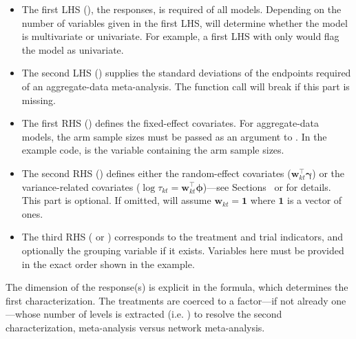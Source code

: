 \begin{itemize}
  \item The first LHS (), the responses, is required of all models. Depending on the number of variables given in the first LHS,  will determine whether the model is multivariate or univariate. For example, a first LHS with only  would flag the model as univariate.
  \item The second LHS () supplies the standard deviations of the endpoints required of an aggregate-data meta-analysis. The function call will break if this part is missing.
  \item The first RHS () defines the fixed-effect covariates. For aggregate-data models, the arm sample sizes must be passed as an argument to . In the example code,  is the variable containing the arm sample sizes.
  \item The second RHS () defines either the random-effect covariates ($\boldsymbol{w}_{kt}^\top \boldsymbol{\gamma}$) or the variance-related covariates ($\log \tau_{kt} = \boldsymbol{w}_{kt}^\top \boldsymbol{\phi}$)---see {\color{black}Sections~ or  for details}. This part is optional. If omitted,  will assume $\boldsymbol{w}_{kt}=\boldsymbol{1}$ where $\boldsymbol{1}$ is a vector of ones.
  \item The third RHS ( or ) corresponds to the treatment and trial indicators, and optionally the grouping variable if it exists. Variables here must be provided in the exact order shown in the example.
\end{itemize}

The dimension of the response(s) is explicit in the formula, which determines the first characterization. The treatments are coerced to a factor---if not already one---whose number of levels is extracted (i.e. ) to resolve the second characterization, meta-analysis versus network meta-analysis.

